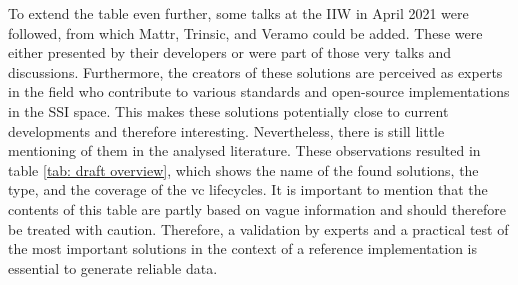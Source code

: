     To extend the table even further, some talks at the \ac{IIW} in April 2021 were followed, from which Mattr, Trinsic, and Veramo could be added. These were either presented by their developers or were part of those very talks and discussions. Furthermore, the creators of these solutions are perceived as experts in the field who  contribute to various standards and open-source implementations in the \ac{SSI} space. This makes these solutions potentially close to current developments and therefore interesting. Nevertheless, there is still little mentioning of them in the analysed literature. These observations resulted in table \ref{tab: draft overview}, which shows the name of the found solutions, the type, and the coverage of the \ac{vc} lifecycles. It is important to mention that the contents of this table are partly based on vague information and should therefore be treated with caution. Therefore, a validation by experts and a practical test of the most important solutions in the context of a reference implementation is essential to generate reliable data.

